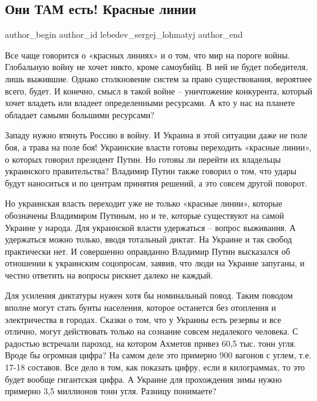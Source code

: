  
 
 
 
 
\subsection{Они ТАМ есть! Красные линии}

\ifcmt
 author_begin
   author_id lebedev_sergej_lohmatyj
 author_end
\fi

Все чаще говорится о «красных линиях» и о том, что мир на пороге войны.
Глобальную войну не хочет никто, кроме самоубийц. В ней не будет победителя,
лишь выжившие. Однако столкновение систем за право существования, вероятнее
всего, будет. И конечно, смысл в такой войне – уничтожение конкурента, который
хочет владеть или владеет определенными ресурсами. А кто у нас на планете
обладает самыми большими ресурсами?

Западу нужно втянуть Россию в войну. И Украина в этой ситуации даже не поле
боя, а трава на поле боя! Украинские власти готовы переходить «красные линии»,
о которых говорил президент Путин. Но готовы ли перейти их владельцы
украинского правительства? Владимир Путин также говорил о том, что удары будут
наноситься и по центрам принятия решений, а это совсем другой поворот.


Но украинская власть переходит уже не только «красные линии», которые
обозначены Владимиром Путиным, но и те, которые существуют на самой Украине у
народа. Для украинской власти удержаться – вопрос выживания. А удержаться можно
только, вводя тотальный диктат. На Украине и так свобод практически нет. И
совершенно оправданно Владимир Путин высказался об отношении к украинским
соцопросам, заявив, что люди на Украине запуганы, и честно ответить на вопросы
рискнет далеко не каждый.

Для усиления диктатуры нужен хотя бы номинальный повод. Таким поводом вполне
могут стать бунты населения, которое останется без отопления и электричества в
городах. Сказки о том, что у Украины есть резервы и все отлично, могут
действовать только на сознание совсем недалекого человека. С радостью встречали
пароход, на котором Ахметов привез 60,5 тыс. тонн угля. Вроде бы огромная
цифра? На самом деле это примерно 900 вагонов с углем, т.е. 17-18 составов. Все
дело в том, как показать цифру, если в килограммах, то это будет вообще
гигантская цифра. А Украине для прохождения зимы нужно примерно 3,5 миллионов
тонн угля. Разницу понимаете?

